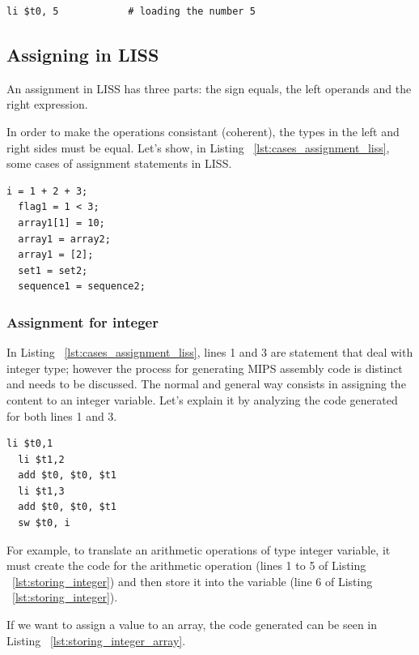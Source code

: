 \documentclass[
  oneside,
  11pt, a4paper,
  footinclude=true,
  headinclude=true,
  cleardoublepage=empty
]{scrbook}
\begin{document}
\begin{lstlisting}[caption={Loading an integer value},label={lst:load_integer_type}]
  li $t0, 5            # loading the number 5
\end{lstlisting}

\subsection{Assigning in LISS}

An assignment in LISS has three parts: the sign equals, the left operands and the right expression.

In order to make the operations consistant (coherent), the types in the left and right sides must be equal.
Let's show, in Listing ~\ref{lst:cases_assignment_liss}, some cases of assignment statements in LISS.

\begin{lstlisting}[caption={Examples of assignment for different types in LISS},label={lst:cases_assignment_liss}]
  i = 1 + 2 + 3;
  flag1 = 1 < 3;
  array1[1] = 10;
  array1 = array2;
  array1 = [2];
  set1 = set2;
  sequence1 = sequence2;
\end{lstlisting}

\subsubsection{Assignment for integer}

In Listing ~\ref{lst:cases_assignment_liss}, lines 1 and 3 are statement that deal with integer type; however the process for generating MIPS assembly code is distinct and needs to be discussed. The normal and general way consists in assigning the content to an integer variable.
Let's explain it by analyzing the code generated for both lines 1 and 3.

\begin{lstlisting}[caption={Code generated for line 1 in Listing ~\ref{lst:cases_assignment_liss}},label={lst:storing_integer}]
  li $t0,1		
  li $t1,2		
  add $t0, $t0, $t1	
  li $t1,3		
  add $t0, $t0, $t1	
  sw $t0, i		
\end{lstlisting}

For example, to translate an arithmetic operations of type integer variable, it must create the code for the arithmetic operation (lines 1 to 5 of Listing ~\ref{lst:storing_integer}) and then store it into the variable (line 6 of Listing ~\ref{lst:storing_integer}).

If we want to assign a value to an array, the code generated can be seen in Listing ~\ref{lst:storing_integer_array}.
\end{document}
